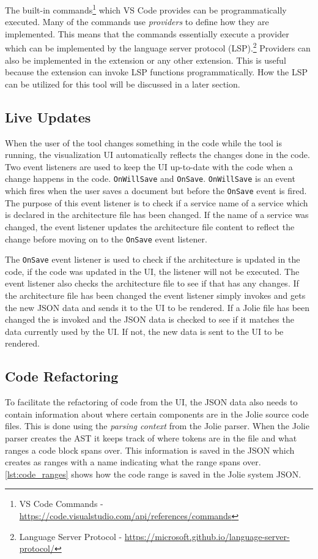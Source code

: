 The built-in commands\footnote{VS Code Commands - \url{https://code.visualstudio.com/api/references/commands}} which VS Code provides can be programmatically executed.
Many of the commands use \emph{providers} to define how they are implemented. This means that the commands essentially execute a provider which can be implemented by the language server protocol (LSP).\footnote{Language Server Protocol - \url{https://microsoft.github.io/language-server-protocol/}}
Providers can also be implemented in the extension or any other extension.
This is useful because the extension can invoke LSP functions programmatically. How the LSP can be utilized for this tool will be discussed in a later section.

\subsection{Live Updates}
When the user of the tool changes something in the code while the tool is running, the visualization UI automatically reflects the changes done in the code.
Two event listeners are used to keep the UI up-to-date with the code when a change happens in the code. \texttt{OnWillSave} and \texttt{OnSave}.
\texttt{OnWillSave} is an event which fires when the user saves a document but before the \texttt{OnSave} event is fired. The purpose of this event listener is
to check if a service name of a service which is declared in the architecture file has been changed. If the name of a service was changed, the event listener updates the architecture file content to reflect the change before moving on to the \texttt{OnSave} event listener.

The \texttt{OnSave} event listener is used to check if the architecture is updated in the code, if the code was updated in the UI, the listener will not be executed. The event listener also checks the architecture file to see if that has any changes.
If the architecture file has been changed the event listener simply invokes \nodetoolname[] and gets the new JSON data and sends it to the UI to be rendered.
If a Jolie file has been changed the \nodetoolname[] is invoked and the JSON data is checked to see if it matches the data currently used by the UI. If not, the new data is sent to the UI to be rendered.

\subsection{Code Refactoring}
To facilitate the refactoring of code from the UI, the JSON data also needs to contain information about where certain components are in the Jolie source code files.
This is done using the \emph{parsing context} from the Jolie parser. When the Jolie parser creates the AST it keeps track of where tokens are in the file and what ranges a code block spans over.
This information is saved in the JSON which \javatoolname[] creates as ranges with a name indicating what the range spans over.
\cref{lst:code_ranges} shows how the code range is saved in the Jolie system JSON.

